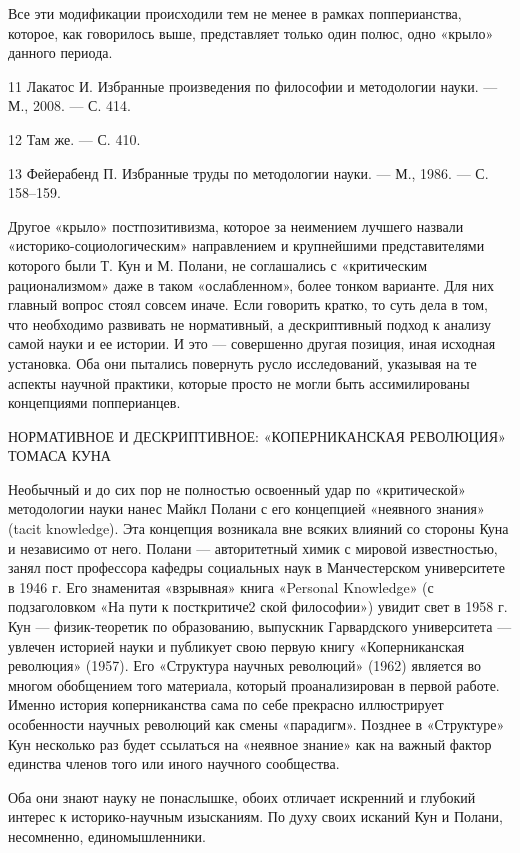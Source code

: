 \documentclass[11pt,a4paper]{article}
\begin{document}
Все эти модификации происходили тем не менее в рамках попперианства, которое,
как говорилось выше, представляет только один полюс, одно «крыло» данного
периода.

11 Лакатос И. Избранные произведения по философии и методологии науки. — М.,
2008. — С. 414.

12 Там же. — С. 410.

13 Фейерабенд П. Избранные труды по методологии науки. — М., 1986. —
С. 158–159.

Другое «крыло» постпозитивизма, которое за неимением лучшего назвали
«историко-социологическим» направлением и крупнейшими представителями которого
были Т. Кун и М. Полани, не соглашались с «критическим рационализмом» даже в
таком «ослабленном», более тонком варианте. Для них главный вопрос стоял
совсем иначе. Если говорить кратко, то суть дела в том, что необходимо
развивать не нормативный, а дескриптивный подход к анализу самой науки и ее
истории. И это — совершенно другая позиция, иная исходная установка. Оба они
пытались повернуть русло исследований, указывая на те аспекты научной
практики, которые просто не могли быть ассимилированы концепциями
попперианцев.

НОРМАТИВНОЕ И ДЕСКРИПТИВНОЕ: «КОПЕРНИКАНСКАЯ РЕВОЛЮЦИЯ» ТОМАСА КУНА

Необычный и до сих пор не полностью освоенный удар по «критической»
методологии науки нанес Майкл Полани с его концепцией «неявного знания» (tacit
knowledge). Эта концепция возникала вне всяких влияний со стороны Куна и
независимо от него. Полани — авторитетный химик с мировой известностью, занял
пост профессора кафедры социальных наук в Манчестерском университете в 1946
г. Его знаменитая «взрывная» книга «Personal Knowledge» (с подзаголовком «На
пути к посткритиче2 ской философии») увидит свет в 1958 г. Кун —
физик-теоретик по образованию, выпускник Гарвардского университета — увлечен
историей науки и публикует свою первую книгу «Коперниканская революция»
(1957). Его «Структура научных революций» (1962) является во многом обобщением
того материала, который проанализирован в первой работе. Именно история
коперниканства сама по себе прекрасно иллюстрирует особенности научных
революций как смены «парадигм». Позднее в «Структуре» Кун несколько раз
будет ссылаться на «неявное знание» как на важный фактор единства членов того
или иного научного сообщества.

Оба они знают науку не понаслышке, обоих отличает искренний и глубокий
интерес к историко-научным изысканиям.  По духу своих исканий Кун и Полани,
несомненно, единомышленники.
\end{document}
